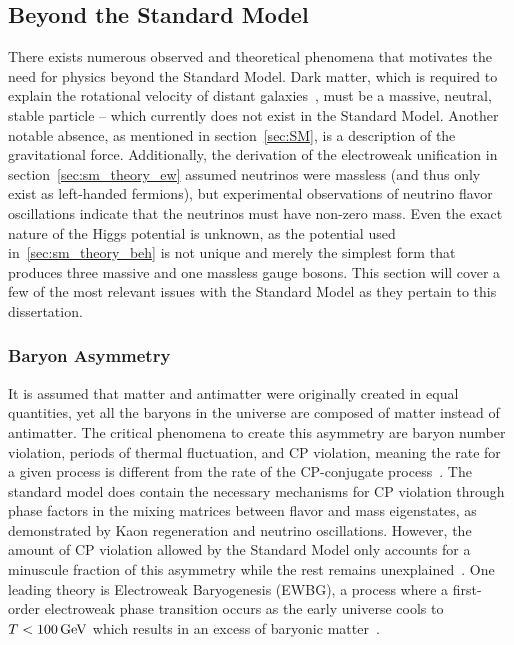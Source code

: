 \subsection{Beyond the Standard Model} \label{sec:theory_motivation}
There exists numerous observed and theoretical phenomena that motivates the need for physics beyond the Standard Model. Dark matter, which is required to explain the rotational velocity of distant galaxies~\cite{zwicky_dm}, must be a massive, neutral, stable particle -- which currently does not exist in the Standard Model. Another notable absence, as mentioned in section~\ref{sec:SM}, is a description of the gravitational force. Additionally, the derivation of the electroweak unification in section~\ref{sec:sm_theory_ew} assumed neutrinos were massless (and thus only exist as left-handed fermions), but experimental observations of neutrino flavor oscillations indicate that the neutrinos must have non-zero mass. Even the exact nature of the Higgs potential is unknown, as the potential used in~\ref{sec:sm_theory_beh} is not unique and merely the simplest form that produces three massive and one massless gauge bosons. This section will cover a few of the most relevant issues with the Standard Model as they pertain to this dissertation.

\subsubsection{Baryon Asymmetry} \label{sec:baryon_asymmetry}
It is assumed that matter and antimatter were originally created in equal quantities, yet all the baryons in the universe are composed of matter instead of antimatter. The critical phenomena to create this asymmetry are baryon number violation, periods of thermal fluctuation, and CP violation, meaning the rate for a given process is different from the rate of the CP-conjugate process~\cite{Sakharov:1967dj}. The standard model does contain the necessary mechanisms for CP violation through phase factors in the mixing matrices between flavor and mass eigenstates, as demonstrated by Kaon regeneration and neutrino oscillations. However, the amount of CP violation allowed by the Standard Model only accounts for a minuscule fraction of this asymmetry while the rest remains unexplained~\cite{Peskin2002}. One leading theory is Electroweak Baryogenesis (EWBG), a process where a first-order electroweak phase transition occurs as the early universe cools to $T<100\,\text{Ge\hspace{-.08em}V}$ which results in an excess of baryonic matter~\cite{ewbg1,ewbg2}.

